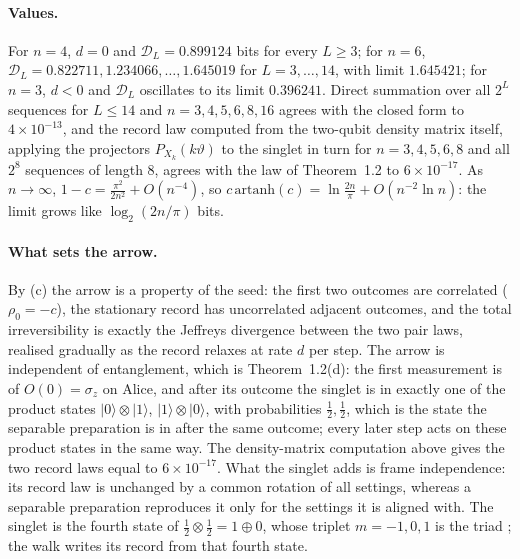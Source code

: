 \documentclass[11pt]{article}
\theoremstyle{definition}\newtheorem{definition}[theorem]{Definition}
\theoremstyle{remark}\newtheorem{remark}[theorem]{Remark}
\begin{document}
\paragraph{Values.} For $n=4$, $d=0$ and $\mathcal D_L=0.899124$ bits for every $L\ge3$; for $n=6$, $\mathcal D_L=0.822711,1.234066,\dots,1.645019$ for $L=3,\dots,14$, with limit $1.645421$; for $n=3$, $d<0$ and $\mathcal D_L$ oscillates to its limit $0.396241$. Direct summation over all $2^L$ sequences for $L\le14$ and $n=3,4,5,6,8,16$ agrees with the closed form to $4\times10^{-13}$, and the record law computed from the two-qubit density matrix itself, applying the projectors $P_{X_k}(k\vartheta)$ to the singlet in turn for $n=3,4,5,6,8$ and all $2^8$ sequences of length $8$, agrees with the law of Theorem~1.2 to $6\times10^{-17}$. As $n\to\infty$, $1-c=\frac{\pi^2}{2n^2}+O(n^{-4})$, so $c\,\mathrm{artanh}(c)=\ln\frac{2n}\pi+O(n^{-2}\ln n)$: the limit grows like $\log_2(2n/\pi)$ bits.

\paragraph{What sets the arrow.} By (c) the arrow is a property of the seed: the first two outcomes are correlated ($\rho_0=-c$), the stationary record has uncorrelated adjacent outcomes, and the total irreversibility is exactly the Jeffreys divergence between the two pair laws, realised gradually as the record relaxes at rate $d$ per step. The arrow is independent of entanglement, which is Theorem~1.2(d): the first measurement is of $O(0)=\sigma_z$ on Alice, and after its outcome the singlet is in exactly one of the product states $|0\rangle\otimes|1\rangle$, $|1\rangle\otimes|0\rangle$, with probabilities $\frac12,\frac12$, which is the state the separable preparation is in after the same outcome; every later step acts on these product states in the same way. The density-matrix computation above gives the two record laws equal to $6\times10^{-17}$. What the singlet adds is frame independence: its record law is unchanged by a common rotation of all settings, whereas a separable preparation reproduces it only for the settings it is aligned with. The singlet is the fourth state of $\frac12\otimes\frac12=1\oplus0$, whose triplet $m=-1,0,1$ is the triad \cite{SQuant}; the walk writes its record from that fourth state.
\end{document}
